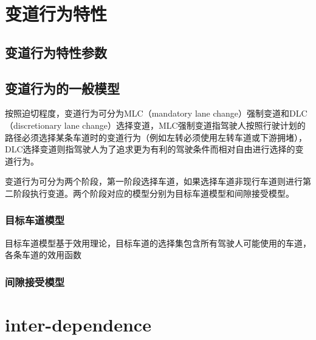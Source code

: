 
\section{变道行为特性}
\subsection{变道行为特性参数}

\subsection{变道行为的一般模型}
按照迫切程度，变道行为可分为MLC（mandatory lane change）强制变道和DLC（discretionary lane change）选择变道，MLC强制变道指驾驶人按照行驶计划的路径必须选择某条车道时的变道行为（例如左转必须使用左转车道或下游拥堵），DLC选择变道则指驾驶人为了追求更为有利的驾驶条件而相对自由进行选择的变道行为。

变道行为可分为两个阶段，第一阶段选择车道，如果选择车道非现行车道则进行第二阶段执行变道。两个阶段对应的模型分别为目标车道模型和间隙接受模型。
\subsubsection{目标车道模型}
目标车道模型基于效用理论，目标车道的选择集包含所有驾驶人可能使用的车道，各条车道的效用函数
\subsubsection{间隙接受模型}

\section{inter-dependence}

